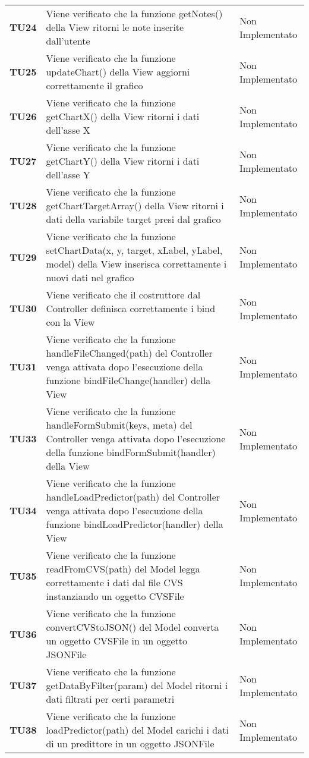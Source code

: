 \documentclass[../piano-di-qualifica.tex]{subfiles}
\begin{document}
\begin{longtable}[H]{>{\centering\bfseries}m{2.5cm} >{\centering}m{7.5cm} >{\centering\arraybackslash}m{3.5cm}}
  \textbf{TU24} & Viene verificato che la funzione getNotes() della View ritorni le note inserite dall'utente & Non Implementato \\
  \textbf{TU25} & Viene verificato che la funzione updateChart() della View aggiorni correttamente il grafico & Non Implementato \\
  \textbf{TU26} & Viene verificato che la funzione getChartX() della View ritorni i dati dell'asse X & Non Implementato \\
  \textbf{TU27} & Viene verificato che la funzione getChartY() della View ritorni i dati dell'asse Y & Non Implementato \\
  \textbf{TU28} & Viene verificato che la funzione getChartTargetArray() della View ritorni i dati della variabile target presi dal grafico & Non Implementato \\
  \textbf{TU29} & Viene verificato che la funzione setChartData(x, y, target, xLabel, yLabel, model) della View inserisca correttamente i nuovi dati nel grafico & Non Implementato \\
  \textbf{TU30} & Viene verificato che il costruttore dal Controller definisca correttamente i bind con la View & Non Implementato \\
  \textbf{TU31} & Viene verificato che la funzione handleFileChanged(path) del Controller venga attivata dopo l'esecuzione della funzione bindFileChange(handler) della View & Non Implementato \\
  \textbf{TU33} & Viene verificato che la funzione handleFormSubmit(keys, meta) del Controller venga attivata dopo l'esecuzione della funzione bindFormSubmit(handler) della View & Non Implementato \\
  \textbf{TU34} & Viene verificato che la funzione handleLoadPredictor(path) del Controller venga attivata dopo l'esecuzione della funzione bindLoadPredictor(handler) della View & Non Implementato \\
  \textbf{TU35} & Viene verificato che la funzione readFromCVS(path) del Model legga correttamente i dati dal file CVS instanziando un oggetto CVSFile & Non Implementato \\
  \textbf{TU36} & Viene verificato che la funzione convertCVStoJSON() del Model converta un oggetto CVSFile in un oggetto JSONFile & Non Implementato \\
  \textbf{TU37} & Viene verificato che la funzione getDataByFilter(param) del Model ritorni i dati filtrati per certi parametri & Non Implementato \\
  \textbf{TU38} & Viene verificato che la funzione loadPredictor(path) del Model carichi i dati di un predittore in un oggetto JSONFile & Non Implementato \\

\end{longtable}
\end{document}
